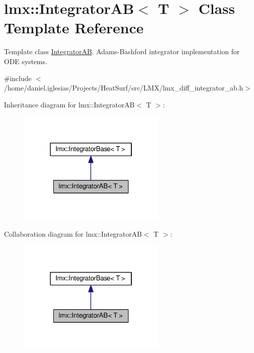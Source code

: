 \hypertarget{classlmx_1_1IntegratorAB}{\section{lmx\-:\-:Integrator\-A\-B$<$ T $>$ Class Template Reference}
\label{classlmx_1_1IntegratorAB}
}


Template class \hyperlink{classlmx_1_1IntegratorAB}{Integrator\-A\-B}. Adams-\/\-Bashford integrator implementation for O\-D\-E systems.  




{\ttfamily \#include $<$/home/daniel.\-iglesias/\-Projects/\-Heat\-Surf/src/\-L\-M\-X/lmx\-\_\-diff\-\_\-integrator\-\_\-ab.\-h$>$}



Inheritance diagram for lmx\-:\-:Integrator\-A\-B$<$ T $>$\-:
\nopagebreak
\begin{figure}[H]
\begin{center}
\leavevmode
\includegraphics[width=202pt]{classlmx_1_1IntegratorAB__inherit__graph}
\end{center}
\end{figure}


Collaboration diagram for lmx\-:\-:Integrator\-A\-B$<$ T $>$\-:
\nopagebreak
\begin{figure}[H]
\begin{center}
\leavevmode
\includegraphics[width=202pt]{classlmx_1_1IntegratorAB__coll__graph}
\end{center}
\end{figure}
